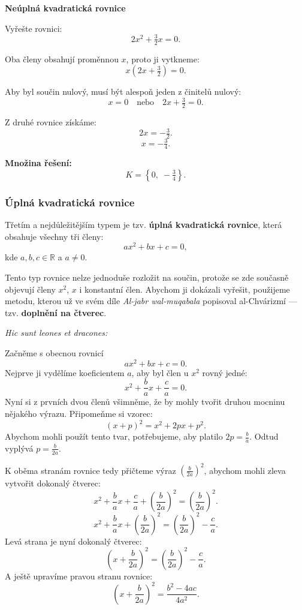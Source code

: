 \documentclass[12pt,a4paper]{article}
\begin{document}
\begin{examplebox}
\textbf{Neúplná kvadratická rovnice}

Vyřešte rovnici:
\[
2x^2 + \tfrac{3}{2}x = 0.
\]

Oba členy obsahují proměnnou \(x\), proto ji vytkneme:
\[
x\left(2x + \tfrac{3}{2}\right) = 0.
\]

Aby byl součin nulový, musí být alespoň jeden z činitelů nulový:
\[
x = 0 \quad \text{nebo} \quad 2x + \tfrac{3}{2} = 0.
\]

Z druhé rovnice získáme:
\[
2x = -\tfrac{3}{2}.
\]
\[
x = -\tfrac{3}{4}.
\]

\textbf{Množina řešení:}
\[
K = \left\{ 0,\; -\tfrac{3}{4} \right\}.
\]
\end{examplebox}





\subsubsection*{Úplná kvadratická rovnice}

Třetím a nejdůležitějším typem je tzv. \textbf{úplná kvadratická rovnice}, 
která obsahuje všechny tři členy:
\[
ax^2 + bx + c = 0,
\]
kde \(a, b, c \in \mathbb{R}\) a \(a \neq 0\).

Tento typ rovnice nelze jednoduše rozložit na součin, 
protože se zde současně objevují členy \(x^2\), \(x\) i konstantní člen.  
Abychom ji dokázali vyřešit, použijeme metodu, kterou už ve svém díle 
\textit{Al-jabr wal-muqabala} popisoval al-Chvárizmí — tzv. \textbf{doplnění na čtverec}.


\textit{Hic sunt leones et dracones:}

Začněme s obecnou rovnicí
\[
ax^2 + bx + c = 0.
\]
Nejprve ji vydělíme koeficientem \(a\), aby byl člen u \(x^2\) rovný jedné:
\[
x^2 + \frac{b}{a}x + \frac{c}{a} = 0.
\]
Nyní si z prvních dvou členů všimněme, že by mohly tvořit druhou mocninu nějakého výrazu.
Připomeňme si vzorec:
\[
(x + p)^2 = x^2 + 2px + p^2.
\]
Abychom mohli použít tento tvar, potřebujeme, aby platilo \(2p = \tfrac{b}{a}\).  
Odtud vyplývá \(p = \tfrac{b}{2a}\).



K oběma stranám rovnice tedy přičteme výraz 
\(\left(\tfrac{b}{2a}\right)^2\), abychom mohli zleva vytvořit dokonalý čtverec:
\[
x^2 + \frac{b}{a}x + \frac{c}{a} + \left(\frac{b}{2a}\right)^2 = \left(\frac{b}{2a}\right)^2.
\]
\[
x^2 + \frac{b}{a}x + \left(\frac{b}{2a}\right)^2 = \left(\frac{b}{2a}\right)^2 - \frac{c}{a}.
\]
Levá strana je nyní dokonalý čtverec:
\[
\left(x + \frac{b}{2a}\right)^2 = \left(\frac{b}{2a}\right)^2 - \frac{c}{a}.
\]
A ještě upravíme pravou stranu rovnice:
\[
\left(x + \frac{b}{2a}\right)^2 = \frac{b^2 - 4ac}{4a^2}.
\]
\end{document}
